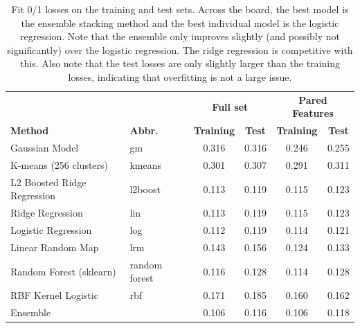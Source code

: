 \documentclass{article} %
\begin{document}
\begin{table}[]
	\centering
	\caption{Fit 0/1 losses on the training and test sets.  Across the board, the best model is the ensemble stacking method and the best individual model is the logistic regression.  Note that the ensemble only improves slightly (and possibly not significantly) over the logistic regression.  The ridge regression is competitive with this.  Also note that the test losses are only slightly larger than the training losses, indicating that overfitting is not a large issue.}
	\label{table:results}
	\begin{tabular}{ll|cc|cc}
		\hline
		 &  & \multicolumn{2}{c}{\textbf{Full set}} & \multicolumn{2}{c}{\textbf{Pared Features}} \\
		\textbf{Method}             & \textbf{Abbr.} & \textbf{Training} & \textbf{Test} & \textbf{Training} & \textbf{Test} \\ \hline
		Gaussian Model              & gm             & 0.316             & 0.316         & 0.246             & 0.255         \\
		K-means (256 clusters)      & kmeans         & 0.301             & 0.307         & 0.291             & 0.311         \\
		L2 Boosted Ridge Regression & l2boost        & 0.113             & 0.119         & 0.115             & 0.123         \\
		Ridge Regression            & lin            & 0.113             & 0.119         & 0.115             & 0.123         \\
		Logistic Regression         & log            & 0.112             & 0.119         & 0.114             & 0.121         \\
		Linear Random Map           & lrm            & 0.143             & 0.156         & 0.124             & 0.133         \\
		Random Forest (sklearn)     & random forest  & 0.116             & 0.128         & 0.114             & 0.128         \\
		RBF Kernel Logistic         & rbf            & 0.171             & 0.185         & 0.160             & 0.162         \\ \hline
		Ensemble                    &                & 0.106             & 0.116         & 0.106             & 0.118         \\ \hline
	\end{tabular}
\end{table}
\end{document}
